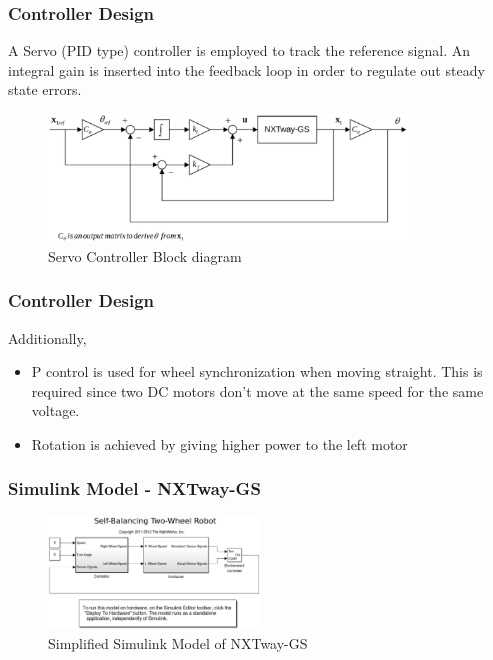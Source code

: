\documentclass[aspectratio=169]{beamer}
\begin{document}

\begin{frame}
\frametitle{Controller Design}
A Servo (PID type) controller is employed to track the reference signal. An integral gain is inserted into the feedback loop in order to regulate out steady state errors. 

\begin{figure}
    \includegraphics[width=0.85\textwidth]{CtrlBlk.eps}
	\caption{Servo Controller Block diagram}
\end{figure}

\end{frame}


\begin{frame}
\frametitle{Controller Design}
Additionally,
\begin{itemize}
\item P control is used for wheel synchronization when moving straight. This is required since two DC motors don't move at the same speed for the same voltage.
\item Rotation is achieved by giving higher power to the left motor
\end{itemize}
\end{frame}


\begin{frame}
\frametitle{Simulink Model - NXTway-GS}
\begin{figure}
	\includegraphics[width=0.5\textwidth]{smdlBot_1.eps}
	\caption{Simplified Simulink Model of NXTway-GS}
\end{figure}
\end{frame}
\end{document}
